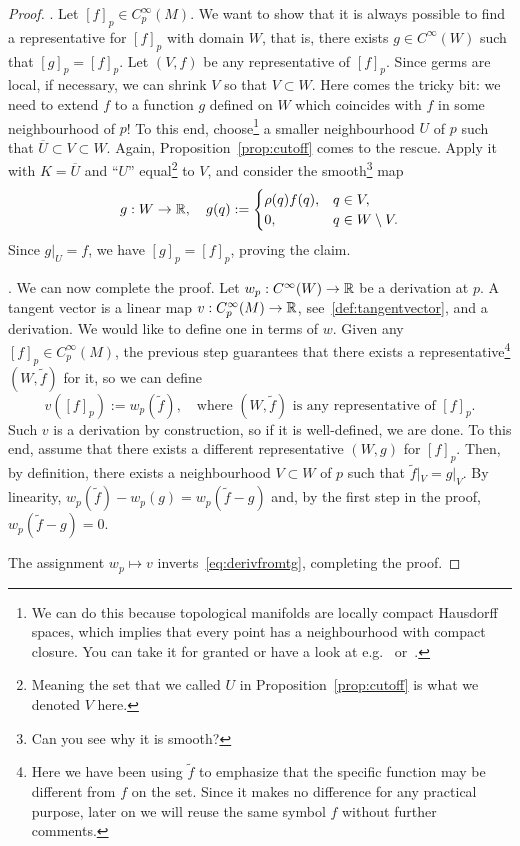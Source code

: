 \begin{proof}
	.
	Let $[f]_p\in C_p^\infty(M)$.
	We want to show that it is always possible to find a representative for $[f]_p$ with domain $W$, that is, there exists $g\in C^\infty(W)$ such that $[g]_p = [f]_p$.
	Let $(V, f)$ be any representative of $[f]_p$.
	Since germs are local, if necessary, we can shrink $V$ so that $V\subset W$.
	Here comes the tricky bit: we need to extend $f$ to a function $g$ defined on $W$ which coincides with $f$ in some neighbourhood of $p$!
	To this end, choose\footnote{We can do this because topological manifolds are locally compact Hausdorff spaces, which implies that every point has a neighbourhood with compact closure. You can take it for granted or have a look at e.g.~\cite[Lemma 4.65]{book:lee:topology} or~\cite{book:munkres:topology}.} a smaller neighbourhood $U$ of $p$ such that $\overline{U}\subset V\subset W$.
	Again, Proposition~\ref{prop:cutoff} comes to the rescue. Apply it with $K=\overline{U}$ and ``$U$'' equal\footnote{Meaning the set that we called $U$ in Proposition~\ref{prop:cutoff} is what we denoted $V$ here.} to $V$, and consider the smooth\footnote{Can you see why it is smooth?} map
	\begin{equation}
		g:W\to\mathbb{R}, \quad
		g(q) := \begin{cases}
			\rho(q)f(q), & q\in V,             \\
			0,           & q \in W\setminus V.
		\end{cases}
	\end{equation}
	Since $g|_U = f$, we have $[g]_p = [f]_p$, proving the claim.

	. We can now complete the proof.
	Let $w_p:C^\infty(W) \to\mathbb{R}$ be a derivation at $p$.
	A tangent vector is a linear map $v:C_p^\infty(M)\to\mathbb{R}$, see~\eqref{def:tangentvector}, and a derivation.
	We would like to define one in terms of $w$.
	Given any $[f]_p\in C_p^\infty(M)$, the previous step guarantees that there exists a representative\footnote{Here we have been using $\widetilde{f}$ to emphasize that the specific function may be different from $f$ on the set. Since it makes no difference for any practical purpose, later on we will reuse the same symbol $f$ without further comments.} $(W,\widetilde{f})$ for it, so we can define
	\begin{equation}
		v([f]_p) := w_p(\widetilde{f}), \quad\mbox{where $(W,\widetilde{f})$ is any representative of $[f]_p$}.
	\end{equation}
	Such $v$ is a derivation by construction, so if it is well-defined, we are done.
	To this end, assume that there exists a different representative $(W, g)$ for $[f]_p$.
	Then, by definition, there exists a neighbourhood $V\subset W$ of $p$ such that $\widetilde{f}|_V = g|_V$.
	By linearity, $w_p(\widetilde{f}) - w_p(g) = w_p(\widetilde{f}-g)$ and, by the first step in the proof, $w_p(\widetilde{f}-g) = 0$.

	The assignment $w_p\mapsto v$ inverts~\eqref{eq:derivfromtg}, completing the proof.
\end{proof}

